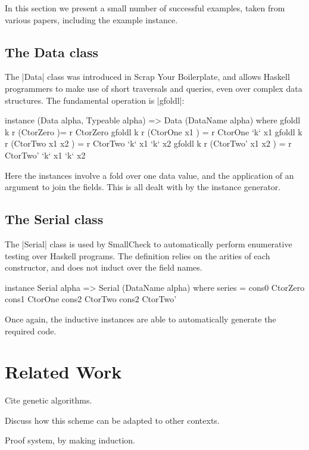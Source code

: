\documentclass{llncs}
\begin{document}
In this section we present a small number of successful examples, taken from various papers, including the example instance.


\subsection{The Data class}

The |Data| class was introduced in Scrap Your Boilerplate, and allows Haskell programmers to make use of short traversals and queries, even over complex data structures. The fundamental operation is |gfoldl|:

\begin{code}
instance (Data alpha, Typeable alpha) => Data (DataName alpha) where
    gfoldl k r (CtorZero         )= r CtorZero
    gfoldl k r (CtorOne   x1     ) = r CtorOne   `k` x1
    gfoldl k r (CtorTwo   x1 x2  ) = r CtorTwo   `k` x1 `k` x2
    gfoldl k r (CtorTwo'  x1 x2  ) = r CtorTwo'  `k` x1 `k` x2
\end{code}

Here the instances involve a fold over one data value, and the application of an argument to join the fields. This is all dealt with by the instance generator.

\subsection{The Serial class}

The |Serial| class is used by SmallCheck to automatically perform enumerative testing over Haskell programs. The definition relies on the arities of each constructor, and does not induct over the field names.

\begin{code}
instance Serial alpha => Serial (DataName alpha) where
    series = cons0 CtorZero \/ cons1 CtorOne  \/ cons2 CtorTwo  \/ cons2 CtorTwo'
\end{code}

Once again, the inductive instances are able to automatically generate the required code.

\section{Related Work}

Cite genetic algorithms.

Discuss how this scheme can be adapted to other contexts.

Proof system, by making induction.
\end{document}
